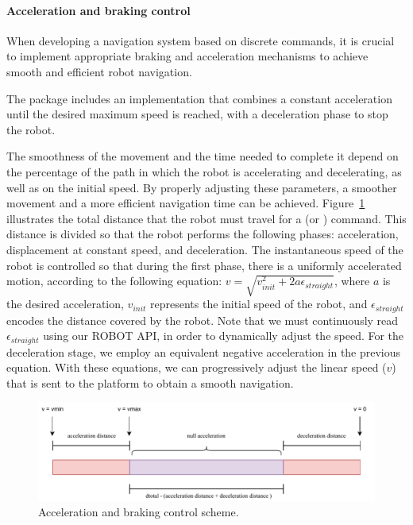 \paragraph*{\textbf{Acceleration and braking control}}\label{par:start-and-brake-control}

When developing a navigation system based on discrete commands, it is crucial to implement appropriate braking and acceleration mechanisms to achieve smooth and efficient robot navigation.

The package includes an implementation that combines a constant acceleration until the desired maximum speed is reached, with a deceleration phase to stop the robot.

The smoothness of the movement and the time needed to complete it depend on the percentage of the path in which the robot is accelerating and decelerating, as well as on the initial speed.
By properly adjusting these parameters, a smoother movement and a more efficient navigation time can be achieved.
Figure~\ref{fig:acceleration_stop} illustrates the total distance that the robot must travel for a \moveforward (or \movebackward) command.
This distance is divided so that the robot performs the following phases: acceleration, displacement at constant speed, and deceleration.
The instantaneous speed of the robot is controlled so that during the first phase, there is a uniformly accelerated motion, according to the following equation: $v = \sqrt{v_{init}^2 + 2 a \epsilon_{straight}}$, where $a$ is the desired acceleration, $v_{init}$ represents the initial speed of the robot, and $\epsilon_{straight}$ encodes the distance covered by the robot.
Note that we must continuously read $\epsilon_{straight}$ using our ROBOT API, in order to dynamically adjust the speed.
For the deceleration stage, we employ an equivalent negative acceleration in the previous equation.
With these equations, we can progressively adjust the linear speed ($v$) that is sent to the platform to obtain a smooth navigation.

\begin{figure}
    \centering
    \includegraphics[width=\linewidth]{figures/ros4vsn/move_robot_acceleration}
    \caption{Acceleration and braking control scheme.}
    \label{fig:acceleration_stop}
\end{figure}

